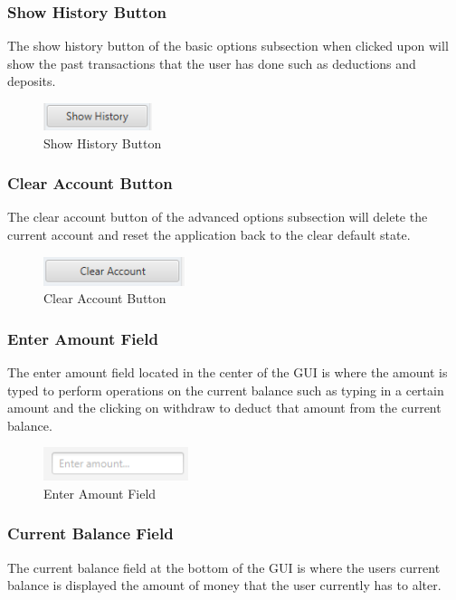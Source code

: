 \documentclass[12pt]{article}
\begin{document}
\subsubsection{Show History Button}
The show history button of the basic options subsection when clicked upon will show the past transactions that the user has done such as deductions and deposits.

\begin{figure}[h!]
  \centering
  \includegraphics[]{show_history_button.png}
  \caption{Show History Button}
\end{figure}

\clearpage

\subsubsection{Clear Account Button}
The clear account button of the advanced options subsection will delete the current account and reset the application back to the clear default state.

\begin{figure}[h!]
  \centering
  \includegraphics[]{clear_account_button.png}
  \caption{Clear Account Button}
\end{figure}

\subsubsection{Enter Amount Field}
The enter amount field located in the center of the GUI is where the amount is typed to perform operations on the current balance such as typing in a certain amount and the clicking on withdraw to deduct that amount from the current balance.

\begin{figure}[h!]
  \centering
  \includegraphics[]{enter_amount.png}
  \caption{Enter Amount Field}
\end{figure}

\subsubsection{Current Balance Field}
The current balance field at the bottom of the GUI is where the users current balance is displayed the amount of money that the user currently has to alter.
\end{document}
